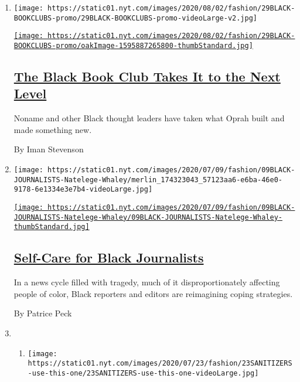 \begin{enumerate}
\def\labelenumi{\arabic{enumi}.}
\item
  \texttt{[image: https://static01.nyt.com/images/2020/08/02/fashion/29BLACK-BOOKCLUBS-promo/29BLACK-BOOKCLUBS-promo-videoLarge-v2.jpg]}

  \href{/2020/07/29/style/self-care/black-book-clubs.html}{\texttt{[image: https://static01.nyt.com/images/2020/08/02/fashion/29BLACK-BOOKCLUBS-promo/oakImage-1595887265800-thumbStandard.jpg]}}

  \hypertarget{the-black-book-club-takes-it-to-the-next-level}{%
  \subsection{\texorpdfstring{\href{/2020/07/29/style/self-care/black-book-clubs.html}{The
  Black Book Club Takes It to the Next
  Level}}{The Black Book Club Takes It to the Next Level}}\label{the-black-book-club-takes-it-to-the-next-level}}

  Noname and other Black thought leaders have taken what Oprah built and
  made something new.

  By Iman Stevenson
\item
  \texttt{[image: https://static01.nyt.com/images/2020/07/09/fashion/09BLACK-JOURNALISTS-Natelege-Whaley/merlin\_174323043\_57123aa6-e6ba-46e0-9178-6e1334e3e7b4-videoLarge.jpg]}

  \href{/2020/07/14/style/self-care/black-journalists.html}{\texttt{[image: https://static01.nyt.com/images/2020/07/09/fashion/09BLACK-JOURNALISTS-Natelege-Whaley/09BLACK-JOURNALISTS-Natelege-Whaley-thumbStandard.jpg]}}

  \hypertarget{self-care-for-black-journalists}{%
  \subsection{\texorpdfstring{\href{/2020/07/14/style/self-care/black-journalists.html}{Self-Care
  for Black
  Journalists}}{Self-Care for Black Journalists}}\label{self-care-for-black-journalists}}

  In a news cycle filled with tragedy, much of it disproportionately
  affecting people of color, Black reporters and editors are reimagining
  coping strategies.

  By Patrice Peck
\item
  \begin{enumerate}
  \def\labelenumii{\arabic{enumii}.}
  \item
    \texttt{[image: https://static01.nyt.com/images/2020/07/23/fashion/23SANITIZERS-use-this-one/23SANITIZERS-use-this-one-videoLarge.jpg]}


\end{enumerate}
\end{enumerate}
